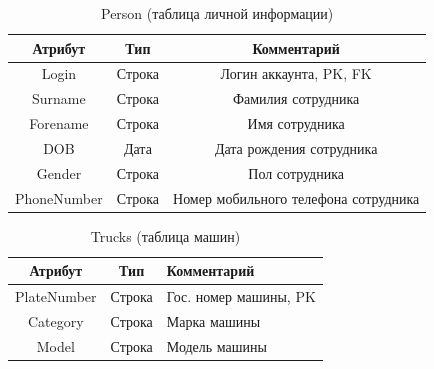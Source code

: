 \begin{table}[h] 
	\begin{center}
		\caption{Person (таблица личной информации)}
		\label{pers_table}
		\begin{tabular}{| c | c | c |}
			\hline
			\textbf{Атрибут}		&	\textbf{Тип}		& \textbf{Комментарий} \\
			\hline
			Login 		&	Строка		&	Логин аккаунта, PK, FK \\ \hline
			Surname 	&	Строка 		&	Фамилия сотрудника \\ \hline
			Forename 	&	Строка 		&	Имя сотрудника \\ \hline
			DOB 		&	Дата		&	Дата рождения сотрудника \\ \hline
			Gender 		&   Строка		&	Пол сотрудника \\ \hline
			PhoneNumber	&   Строка		&	Номер мобильного телефона сотрудника \\ \hline
		\end{tabular}
	\end{center}
\end{table}

\begin{table}[h!] 
	\begin{center}
		\caption{Trucks (таблица машин)}
		\label{truck_table}
		\begin{tabular}{| c | c | p{10cm} |}
			\hline
			\textbf{Атрибут}		&	\textbf{Тип}		& \textbf{Комментарий} \\
			\hline
			PlateNumber	&	Строка	&	Гос. номер машины, PK \\ \hline
			Category	&	Строка	&	Марка машины \\ \hline
			Model		&	Строка	&	Модель машины \\ \hline
		\end{tabular}
	\end{center}
\end{table}

